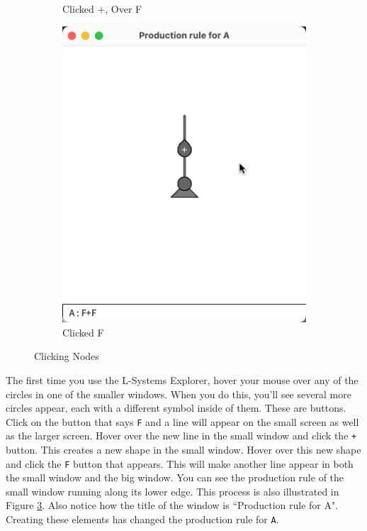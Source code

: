 \documentclass[12pt,twoside]{reedthesis}
\newcommand{\code}[1]{\texttt{#1}}
\begin{document}
\begin{figure}[H]
\begin{subfigure}{0.25\textwidth}
		\caption{Clicked +, Over F}
		\label {HowToExplore1C}
	\end{subfigure}%
	\begin{subfigure}{0.25\textwidth}
		\centering
		\includegraphics[trim={5cm 6cm 2cm 4cm}, clip, width=\textwidth]{Images/HowToExplore1D}
		\caption{Clicked F}
		\label {HowToExplore1D}
	\end{subfigure}
	\caption{Clicking Nodes}
	\label{ClickingNodes}
	\end{figure}
	
	The first time you use the L-Systems Explorer, hover your mouse over any of the circles in one of the smaller windows. When you do this, you'll see several more circles appear, each with a different symbol inside of them. These are buttons. Click on the button that says \code{F} and a line will appear on the small screen as well as the larger screen. Hover over the new line in the small window and click the \code{+} button. This creates a new shape in the small window. Hover over this new shape and click the \code{F} button that appears. This will make another line appear in both the small window and the big window. You can see the production rule of the small window running along its lower edge. This process is also illustrated in Figure \ref{ClickingNodes}. Also notice how the title of the window is ``Production rule for A". Creating these elements has changed the production rule for \code{A}.\\
	
\end{document}

